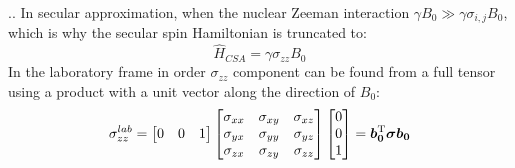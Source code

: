 \documentclass{beamer}
\begin{document}
\begin{frame}{\thesection.\thesubsection. \insertsubsection}
    In secular approximation, when the nuclear Zeeman interaction $\gamma B_0 \gg \gamma \sigma_{i,j} B_0$, which is why the secular spin Hamiltonian is truncated to:
    \begin{equation}
       \hat{H}_{CSA} = \gamma \sigma_{zz} B_0
    \end{equation}
    In the laboratory frame in order  $\sigma_{zz}$ component can be found from a full tensor using a product with a unit vector along the direction of $B_0$:
    \begin{equation} \label{eq:sigma_zz}
       \sigma_{zz}^{lab}= 
       \begin{bmatrix}
          0 & 0 & 1
       \end{bmatrix}       
      \begin{bmatrix}
      \sigma_{xx} & \sigma_{xy} & \sigma_{xz} \\
      \sigma_{yx} & \sigma_{yy} & \sigma_{yz} \\
      \sigma_{zx} & \sigma_{zy} & \sigma_{zz} \\
      \end{bmatrix}       
      \begin{bmatrix}
      0 \\
      0 \\
      1 \\
      \end{bmatrix} = \bm{b_0}^{\rm T} \bm{\sigma} \bm{b_0}
    \end{equation}
\end{frame}
\end{document}
